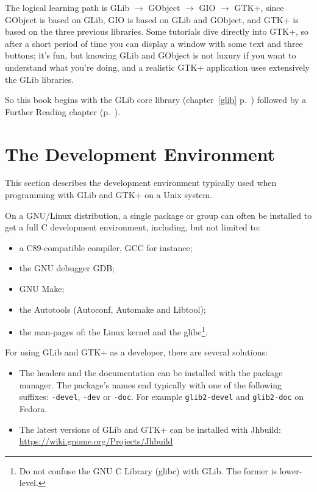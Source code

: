 The logical learning path is GLib $\rightarrow$ GObject $\rightarrow$ GIO $\rightarrow$ GTK+, since GObject is based on GLib, GIO is based on GLib and GObject, and GTK+ is based on the three previous libraries. Some tutorials dive directly into GTK+, so after a short period of time you can display a window with some text and three buttons; it's fun, but knowing GLib and GObject is not luxury if you want to understand what you're doing, and a realistic GTK+ application uses extensively the GLib libraries.

So this book begins with the GLib core library (chapter~\ref{glib} p.~\pageref{glib}) followed by a Further Reading chapter (p.~\pageref{further-reading}).

\section{The Development Environment}
\label{intro-dev-environment}

This section describes the development environment typically used when programming with GLib and GTK+ on a Unix system.

On a GNU/Linux distribution, a single package or group can often be installed to get a full C development environment, including, but not limited to:
\begin{itemize}
  \item a C89-compatible compiler, GCC for instance;
  \item the GNU debugger GDB;
  \item GNU Make;
  \item the Autotools (Autoconf, Automake and Libtool);
  \item the man-pages of: the Linux kernel and the glibc\footnote{Do not confuse the GNU C Library (glibc) with GLib. The former is lower-level.}.
\end{itemize}

For using GLib and GTK+ as a developer, there are several solutions:
\begin{itemize}
  \item The headers and the documentation can be installed with the package manager. The package's names end typically with one of the following suffixes: \texttt{-devel}, \texttt{-dev} or \texttt{-doc}. For example \texttt{glib2-devel} and \texttt{glib2-doc} on Fedora.
  \item The latest versions of GLib and GTK+ can be installed with Jhbuild:\\
  \url{https://wiki.gnome.org/Projects/Jhbuild}
\end{itemize}

